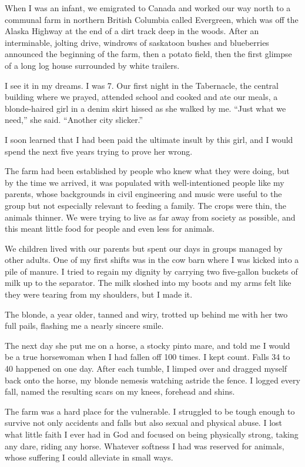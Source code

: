 When I was an infant, we emigrated to Canada and worked our way north to
a communal farm in northern British Columbia called Evergreen, which was
off the Alaska Highway at the end of a dirt track deep in the woods.
After an interminable, jolting drive, windrows of saskatoon bushes and
blueberries announced the beginning of the farm, then a potato field,
then the first glimpse of a long log house surrounded by white trailers.

I see it in my dreams. I was 7. Our first night in the Tabernacle, the
central building where we prayed, attended school and cooked and ate our
meals, a blonde-haired girl in a denim skirt hissed as she walked by me.
``Just what we need,'' she said. ``Another city slicker.''

I soon learned that I had been paid the ultimate insult by this girl,
and I would spend the next five years trying to prove her wrong.

The farm had been established by people who knew what they were doing,
but by the time we arrived, it was populated with well-intentioned
people like my parents, whose backgrounds in civil engineering and music
were useful to the group but not especially relevant to feeding a
family. The crops were thin, the animals thinner. We were trying to live
as far away from society as possible, and this meant little food for
people and even less for animals.

We children lived with our parents but spent our days in groups managed
by other adults. One of my first shifts was in the cow barn where I was
kicked into a pile of manure. I tried to regain my dignity by carrying
two five-gallon buckets of milk up to the separator. The milk sloshed
into my boots and my arms felt like they were tearing from my shoulders,
but I made it.

The blonde, a year older, tanned and wiry, trotted up behind me with her
two full pails, flashing me a nearly sincere smile.

The next day she put me on a horse, a stocky pinto mare, and told me I
would be a true horsewoman when I had fallen off 100 times. I kept
count. Falls 34 to 40 happened on one day. After each tumble, I limped
over and dragged myself back onto the horse, my blonde nemesis watching
astride the fence. I logged every fall, named the resulting scars on my
knees, forehead and shins.

The farm was a hard place for the vulnerable. I struggled to be tough
enough to survive not only accidents and falls but also sexual and
physical abuse. I lost what little faith I ever had in God and focused
on being physically strong, taking any dare, riding any horse. Whatever
softness I had was reserved for animals, whose suffering I could
alleviate in small ways.

